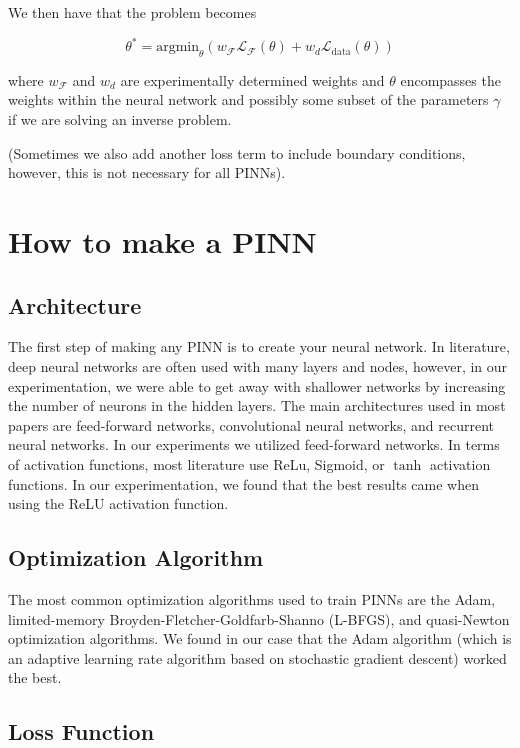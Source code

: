 \documentclass{article}
\begin{document}
We then have that the problem becomes

$$\theta^* = \text{argmin}_{\theta} (w_{\mathcal{F}} \mathcal{L}_{\mathcal{F}}(\theta) + w_d \mathcal{L}_{\text{data}}(\theta))$$

where $w_{\mathcal{F}}$ and $w_d$ are experimentally determined weights and $\theta$ encompasses the weights within the neural network and possibly some subset of the parameters $\gamma$ if we are solving an inverse problem.

(Sometimes we also add another loss term to include boundary conditions, however, this is not necessary for all PINNs).

\section{How to make a PINN}

\subsection{Architecture}

The first step of making any PINN is to create your neural network. In literature, deep neural networks are often used with many layers and nodes, however, in our experimentation, we were able to get away with shallower networks by increasing the number of neurons in the hidden layers. The main architectures used in most papers are feed-forward networks, convolutional neural networks, and recurrent neural networks. In our experiments we utilized feed-forward networks. In terms of activation functions, most literature use ReLu, Sigmoid, or $\tanh$ activation functions. In our experimentation, we found that the best results came when using the ReLU activation function.

\subsection{Optimization Algorithm}

The most common optimization algorithms used to train PINNs are the Adam, limited-memory Broyden-Fletcher-Goldfarb-Shanno (L-BFGS), and quasi-Newton optimization algorithms. We found in our case that the Adam algorithm (which is an adaptive learning rate algorithm based on stochastic gradient descent) worked the best.

\subsection{Loss Function}
\end{document}
